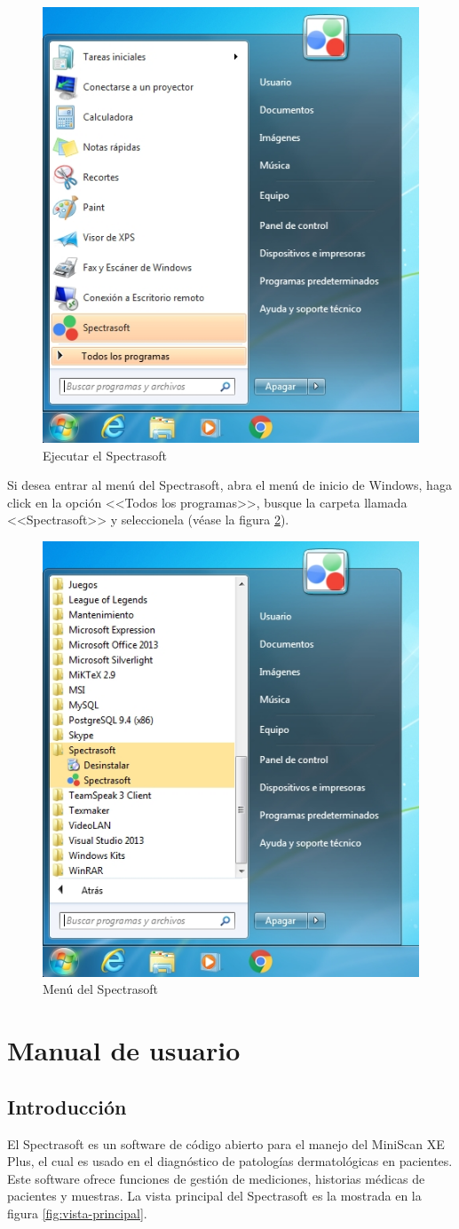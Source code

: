 \begin{figure}[H]
  \centering
  \includegraphics[width=.4\linewidth]{./img/spectrasoft-ejecutable.jpg}
\caption[]{Ejecutar el Spectrasoft\label{fig:spectrasoft-ejecutable}}
\end{figure}

Si desea entrar al men\'{u} del Spectrasoft, abra el men\'{u} de inicio de Windows, haga click en la opci\'{o}n <<Todos los programas>>, busque la carpeta llamada <<Spectrasoft>> y seleccionela (v\'{e}ase la figura \ref{fig:spectrasoft-menu}).

\begin{figure}[H]
  \centering
  \includegraphics[width=.4\linewidth]{./img/spectrasoft-menu.jpg}
\caption[]{Men\'{u} del Spectrasoft\label{fig:spectrasoft-menu}}
\end{figure}
\newpage
\chapter{Manual de usuario}
\thispagestyle{fancy}
\vfill
\section*{Introducci\'{o}n}
	El Spectrasoft es un software de c\'{o}digo abierto para el manejo del MiniScan XE Plus, el cual es usado en el diagn\'{o}stico de patolog\'{i}as dermatol\'{o}gicas en pacientes. Este software ofrece funciones de gesti\'{o}n de mediciones, historias m\'{e}dicas de pacientes y muestras. La vista principal del Spectrasoft es la mostrada en la figura \ref{fig:vista-principal}.

